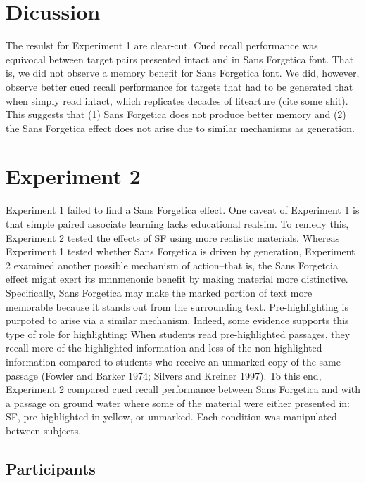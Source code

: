 \documentclass[pdf]{apa6}
\begin{document}
\hypertarget{dicussion}{%
\section{Dicussion}\label{dicussion}}

The resulst for Experiment 1 are clear-cut. Cued recall performance was equivocal between target pairs presented intact and in Sans Forgetica font. That is, we did not observe a memory benefit for Sans Forgetica font. We did, however, observe better cued recall performance for targets that had to be generated that when simply read intact, which replicates decades of litearture (cite some shit). This suggests that (1) Sans Forgetica does not produce better memory and (2) the Sans Forgetica effect does not arise due to similar mechanisms as generation.

\hypertarget{experiment-2}{%
\section{Experiment 2}\label{experiment-2}}

Experiment 1 failed to find a Sans Forgetica effect. One caveat of Experiment 1 is that simple paired associate learning lacks educational realsim. To remedy this, Experiment 2 tested the effects of SF using more realistic materials. Whereas Experiment 1 tested whether Sans Forgetica is driven by generation, Experiment 2 examined another possible mechanism of action--that is, the Sans Forgetcia effect might exert its mnnmenonic benefit by making material more distinctive. Specifically, Sans Forgetica may make the marked portion of text more memorable because it stands out from the surrounding text. Pre-highlighting is purpoted to arise via a similar mechanism. Indeed, some evidence supports this type of role for highlighting: When students read pre-highlighted passages, they recall more of the highlighted information and less of the non-highlighted information compared to students who receive an unmarked copy of the same passage (Fowler and Barker 1974; Silvers and Kreiner 1997). To this end, Experiment 2 compared cued recall performance between Sans Forgetica and with a passage on ground water where some of the material were either presented in: SF, pre-highlighted in yellow, or unmarked. Each condition was manipulated between-subjects.

\hypertarget{participants-1}{%
\subsection{Participants}\label{participants-1}}
\end{document}

